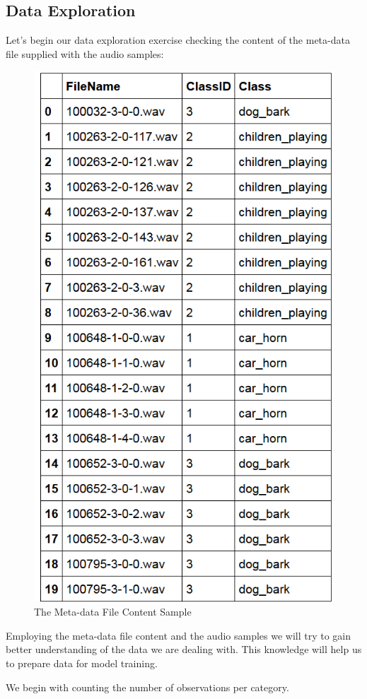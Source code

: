 \hypertarget{data-exploration}{%
\subsection{Data Exploration}\label{data-exploration}}

Let's begin our data exploration exercise checking the content of the
meta-data file supplied with the audio samples:

\begin{Schunk}
\begin{figure}[H]

{\centering \includegraphics[width=0.5\linewidth]{../images/metadata20} 

}

\caption[The Meta-data File Content Sample]{The Meta-data File Content Sample}\label{fig:unnamed-chunk-2}
\end{figure}
\end{Schunk}

Employing the meta-data file content and the audio samples we will try
to gain better understanding of the data we are dealing with. This
knowledge will help us to prepare data for model training.

We begin with counting the number of observations per category.

